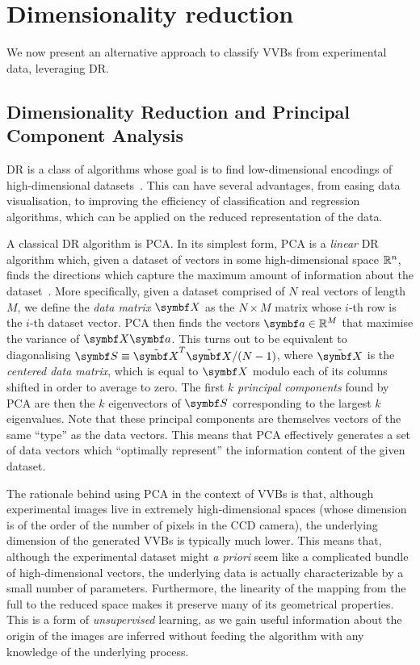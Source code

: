 \section{Dimensionality reduction}
\label{sec:VVBs:dimensionality_reduction}

We now present an alternative approach to classify \acp{VVB} from experimental data, leveraging \ac{DR}.


\subsection{Dimensionality Reduction and Principal Component Analysis}

\acf{DR} is a class of algorithms whose goal is to find low-dimensional encodings of high-dimensional datasets~\cite{cunningham2008dimension,fodor2002survey}.
This can have several advantages, from easing data visualisation, to improving the efficiency of classification and regression algorithms, which can be applied on the reduced representation of the data.

A classical \ac{DR} algorithm is \acf{PCA}.
In its simplest form, \ac{PCA} is a \emph{linear} \ac{DR} algorithm which, given a dataset of vectors in some high-dimensional space ${\mathbb{R}}^n$, finds the directions which capture the maximum amount of information about the dataset~\cite{jolliffe2011principal,jolliffe2016principal}.
More specifically, given a dataset comprised of $N$ real vectors of length $M$, we define the \emph{data matrix} $\bs X$ as the $N\times M$ matrix whose $i$-th row is the $i$-th dataset vector. \ac{PCA} then finds the vectors $\bs a\in\RR^{M}$ that maximise the variance of $\bs X\bs a$. This turns out to be equivalent to diagonalising $\bs S\equiv \tilde{\bs X}^T\tilde{\bs X}/(N-1)$, where $\tilde{\bs X}$ is the \emph{centered data matrix}, which is equal to $\bs X$ modulo each of its columns shifted in order to average to zero.
The first $k$ \emph{principal components} found by \ac{PCA} are then the $k$ eigenvectors of $\bs S$ corresponding to the largest $k$ eigenvalues.
Note that these principal components are themselves vectors of the same ``type'' as the data vectors. This means that \ac{PCA} effectively generates a set of data vectors which ``optimally represent'' the information content of the given dataset.

The rationale behind using \ac{PCA} in the context of \acp{VVB} is that, although experimental images live in extremely high-dimensional spaces (whose dimension is of the order of the number of pixels in the \ac{CCD} camera), the underlying dimension of the generated \acp{VVB} is typically much lower.
This means that, although the experimental dataset might \emph{a priori} seem like a complicated bundle of high-dimensional vectors, the underlying data is actually characterizable by a small number of parameters. Furthermore, the linearity of the mapping from the full to the reduced space makes it preserve many of its geometrical properties.
This is a form of \emph{unsupervised} learning, as we gain useful information about the origin of the images are inferred without feeding the algorithm with any knowledge of the underlying process.


